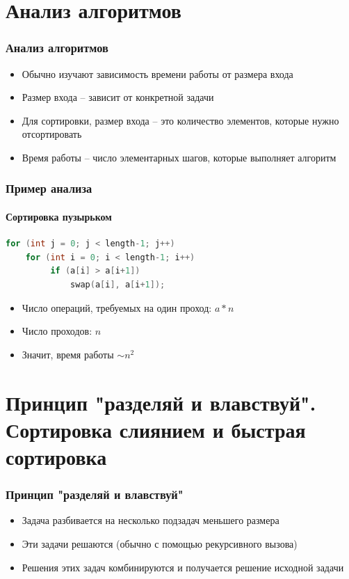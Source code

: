\documentclass[12pt,pdf,hyperref={unicode}]{beamer}
\begin{document}
\section{Анализ алгоритмов}

\begin{frame}[fragile]
\frametitle{Анализ алгоритмов} 
\begin{itemize}
\item Обычно изучают зависимость времени работы от размера входа \\
\item Размер входа -- зависит от конкретной задачи \\
\item Для сортировки, размер входа -- это количество элементов, которые нужно отсортировать \\
\item Время работы -- число элементарных шагов, которые выполняет алгоритм
\end{itemize}
\end{frame}

\begin{frame}[fragile]
\frametitle{Пример анализа} 
\framesubtitle{Сортировка пузырьком}
\begin{lstlisting}[language=C++,basicstyle=\ttfamily,keywordstyle=\color{blue}]
for (int j = 0; j < length-1; j++)
    for (int i = 0; i < length-1; i++)
         if (a[i] > a[i+1])
             swap(a[i], a[i+1]);
\end{lstlisting}
\begin{itemize}
\item Число операций, требуемых на один проход: $a * n$\\
\item Число проходов: $n$\\
\item Значит, время работы $\sim n^2$\\
\end{itemize}

\end{frame}


\section{Принцип "разделяй и влавствуй". Сортировка слиянием и быстрая сортировка}

\begin{frame}[fragile]
\frametitle{Принцип "разделяй и влавствуй"} 
\begin{itemize}
\item Задача разбивается на несколько подзадач меньшего размера \\
\item Эти задачи решаются (обычно с помощью рекурсивного вызова) \\
\item Решения этих задач комбинируются и получается решение исходной задачи \\
\end{itemize}
\end{frame}
\end{document}
